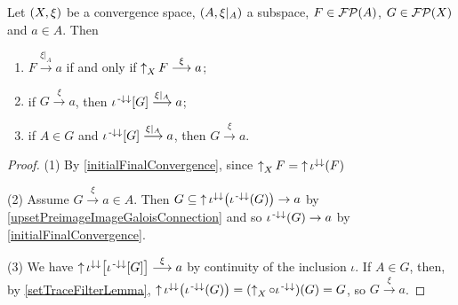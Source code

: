 \begin{lemma} \label{subspaceConvergence}
Let $\sSet{X,\xi}$ be a convergence space, $\sSet{A,\xi|_A}$ a subspace, $F\in \operatorname{\mathcal{FP}}(A)$, $G\in \operatorname{\mathcal{FP}}(X)$ and $a\in A$. Then
\begin{enumerate}
\item $F \overset{\xi|_A}{\longrightarrow} a$ if and only if $\operatorname{\uparrow}_X F \overset{\xi}{\longrightarrow} a$;
\item if $G\overset{\xi}{\longrightarrow} a$, then $\iota^{{\text{\hspace{0.15em}-}\downarrow}\downarrow}[G]\overset{\xi|_A}{\longrightarrow} a$;
\item if $A\in G$ and $\iota^{{\text{\hspace{0.15em}-}\downarrow}\downarrow}[G]\overset{\xi|_A}{\longrightarrow} a$, then $G\overset{\xi}{\longrightarrow} a$.
\end{enumerate}
\end{lemma}
\begin{proof}
(1) By \ref{initialFinalConvergence}, since $\operatorname{\uparrow}_X F = \operatorname{\uparrow} \iota^{\downarrow\downarrow}(F)$

(2) Assume $G\overset{\xi}{\longrightarrow} a \in A$. Then $G \subseteq \operatorname{\uparrow}\iota^{\downarrow\downarrow}\big(\iota^{{\text{\hspace{0.15em}-}\downarrow}\downarrow}(G)\big) \to a$ by \ref{upsetPreimageImageGaloisConnection} and so $\iota^{{\text{\hspace{0.15em}-}\downarrow}\downarrow}(G) \to a$ by \ref{initialFinalConvergence}.

(3) We have $\operatorname{\uparrow}\iota^{\downarrow\downarrow}\big[\iota^{{\text{\hspace{0.15em}-}\downarrow}\downarrow}[G]\big] \overset{\xi}{\longrightarrow} a$ by continuity of the inclusion $\iota$. If $A\in G$, then, by \ref{setTraceFilterLemma}, $\operatorname{\uparrow}\iota^{\downarrow\downarrow}\big(\iota^{{\text{\hspace{0.15em}-}\downarrow}\downarrow}(G)\big) = (\operatorname{\uparrow}_X\circ \iota^{{\text{\hspace{0.15em}-}\downarrow}\downarrow})(G) = G$, so $G \overset{\xi}{\longrightarrow} a$.
\end{proof}

